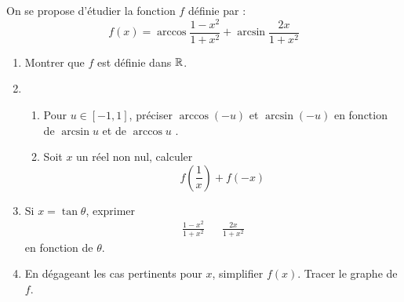 On se propose d'étudier la fonction $f$ définie par :
\begin{displaymath}
 f(x)= \arccos \frac{1-x^2}{1+x^2} + \arcsin \frac{2x}{1+x^2}
\end{displaymath}

\begin{enumerate}
 \item Montrer que $f$ est définie dans $\mathbb{R}$.
 \item \begin{enumerate}
 \item Pour $u\in[-1,1]$, préciser $\arccos (-u)$ et $\arcsin (-u)$ en fonction de $\arcsin u$ et de $\arccos u$ .
  \item Soit $x$ un réel non nul, calculer
\begin{displaymath}
 f(\frac{1}{x})+f(-x)
\end{displaymath}
\end{enumerate}
\item Si $x =\tan \theta$, exprimer 
\begin{align*}
\frac{1-x^2}{1+x^2} & & \frac{2x}{1+x^2} 
\end{align*}
en fonction de $\theta$.
\item En dégageant les cas pertinents pour $x$, simplifier $f(x)$.  Tracer le graphe de $f$.
\end{enumerate}

